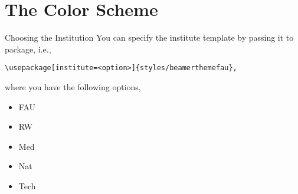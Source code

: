 \section{The Color Scheme}
%
%
%
%
%
\begin{frame}[fragile]{Choosing the Institution}
	You can specify the institute template by passing it to package, i.e.,
	\begin{center}
		\begin{verbatim}
\usepackage[institute=<option>]{styles/beamerthemefau},
\end{verbatim}
	\end{center}
	where you have the following options,
	\begin{itemize}
		\item FAU
		\item RW
		\item Med
		\item Nat
		\item Tech
	\end{itemize}
\end{frame}
%
%
%
%
%
